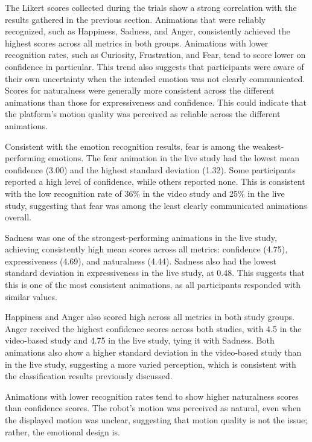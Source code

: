 


The Likert scores collected during the trials show a strong correlation with the results gathered in the previous section. Animations that were reliably recognized, such as Happiness, Sadness, and Anger, consistently achieved the highest scores across all metrics in both groups. Animations with lower recognition rates, such as Curiosity, Frustration, and Fear, tend to score lower on confidence in particular. This trend also suggests that participants were aware of their own uncertainty when the intended emotion was not clearly communicated. Scores for naturalness were generally more consistent across the different animations than those for expressiveness and confidence. This could indicate that the platform's motion quality was perceived as reliable across the different animations. 

 

\newpage



\newpage
Consistent with the emotion recognition results, fear is among the weakest-performing emotions. The fear animation in the live study had the lowest mean confidence (3.00) and the highest standard deviation (1.32). Some participants reported a high level of confidence, while others reported none. This is consistent with the low recognition rate of 
36\% in the video study and 25\% in the live study, suggesting that fear was among the least clearly communicated animations overall.

Sadness was one of the strongest-performing animations in the live study, achieving consistently high mean scores across all metrics: confidence (4.75), expressiveness (4.69), and naturalness (4.44). Sadness also had the lowest standard deviation in expressiveness in the live study, at 0.48. This suggests that this is one of the most consistent animations, as all participants responded with similar values.

Happiness and Anger also scored high across all metrics in both study groups. Anger received the highest confidence scores across both studies, with 4.5 in the video-based study and 4.75 in the live study, tying it with Sadness. Both animations also show a higher standard deviation in the video-based study than in the live study, suggesting a more varied perception, which is consistent with the classification results previously discussed.

Animations with lower recognition rates tend to show higher naturalness scores than confidence scores. The robot's motion was perceived as natural, even when the displayed motion was unclear, suggesting that motion quality is not the issue; rather, the emotional design is.

